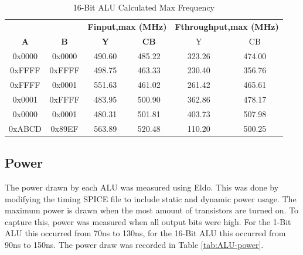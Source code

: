 \documentclass[11pt]{article}
\begin{document}
			\begin{table}[H]
				\centering
				\caption{16-Bit ALU Calculated Max Frequency}
				\label{tab:ALU-16-Bit-Freq}
				\begin{tabular}{|cc|cc|cc|}
					\hline
					\multicolumn{1}{|c}{\textbf{}}  & \multicolumn{1}{c}{\textbf{}}  & \multicolumn{2}{|c|}{\textbf{Finput,max (MHz)}} & \multicolumn{2}{c|}{\textbf{Fthroughput,max (MHz)}} \\
					\textbf{A} & \textbf{B} & \textbf{Y}            & \textbf{CB}           & Y                        & CB                      \\
					\hline
					0x0000     & 0x0000     & 490.60                & 485.22                & 323.26                   & 474.00                  \\
					0xFFFF                         & 0xFFFF                         & 498.75                & 463.33                & 230.40                   & 356.76                  \\
					0xFFFF                         & 0x0001                         & 551.63                & 461.02                & 261.42                   & 465.61                  \\
					0x0001                         & 0xFFFF                         & 483.95                & 500.90                & 362.86                   & 478.17                  \\
					0x0000                         & 0x0001                         & 480.31                & 501.81                & 403.73                   & 507.98                  \\
					0xABCD                         & 0x89EF                         & 563.89                & 520.48                & 110.20                   & 500.25                 \\
					\hline
				\end{tabular}
			\end{table}
	
	\subsection{Power}
	
		The power drawn by each ALU was measured using Eldo. This was done by modifying the timing SPICE file to include static and dynamic power usage. The maximum power is drawn when the most amount of transistors are turned on. To capture this, power was measured when all output bits were high. For the 1-Bit ALU this occurred from 70ns to 130ns, for the 16-Bit ALU this occurred from 90ns to 150ns. The power draw was recorded in Table \ref{tab:ALU-power}.
	
\end{document}
